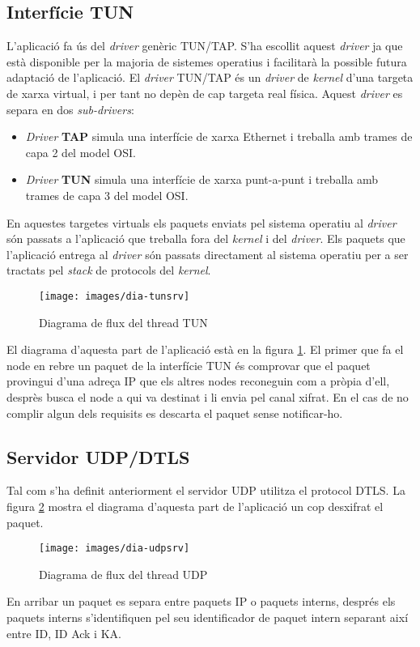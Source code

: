 \subsection{Interfície TUN}
L'aplicació fa ús del \emph{driver} genèric TUN/TAP. S'ha escollit aquest \emph{driver} ja que està disponible per la majoria de sistemes operatius i facilitarà la possible futura adaptació de l'aplicació.
El \emph{driver} TUN/TAP és un \emph{driver} de \emph{kernel} d'una targeta de xarxa virtual, i per tant no depèn de cap targeta real física.
Aquest \emph{driver} es separa en dos \emph{sub-drivers}:
\begin{itemize}
\item \emph{Driver} \textbf{TAP} simula una interfície de xarxa Ethernet i treballa amb trames de capa 2 del model OSI.
\item \emph{Driver} \textbf{TUN} simula una interfície de xarxa punt-a-punt i treballa amb trames de capa 3 del model OSI.
\end{itemize}
En aquestes targetes virtuals els paquets enviats pel sistema operatiu al \emph{driver} són passats a l'aplicació que treballa fora del \emph{kernel} i del \emph{driver}. Els paquets que l'aplicació entrega al \emph{driver} són passats directament al sistema operatiu per a ser tractats pel \emph{stack} de protocols del \emph{kernel}.

\begin{figure}[htb]
\centering
\texttt{[image: images/dia-tunsrv]}
\caption{Diagrama de flux del thread TUN}
\label{F:dia-tunsrv}
\end{figure}
El diagrama d'aquesta part de l'aplicació està en la figura \ref{F:dia-tunsrv}.
El primer que fa el node en rebre un paquet de la interfície TUN és comprovar que el paquet provingui d'una adreça IP que els altres nodes reconeguin com a pròpia d'ell, desprès busca el node a qui va destinat i li envia pel canal xifrat. En el cas de no complir algun dels requisits es descarta el paquet sense notificar-ho.

\subsection{Servidor UDP/DTLS}
Tal com s'ha definit anteriorment el servidor UDP utilitza el protocol DTLS. La figura \ref{F:dia-udpsrv} mostra el diagrama d'aquesta part de l'aplicació un cop desxifrat el paquet.
\begin{figure}[htb]
\centering
\texttt{[image: images/dia-udpsrv]}
\caption{Diagrama de flux del thread UDP}
\label{F:dia-udpsrv}
\end{figure}
En arribar un paquet es separa entre paquets IP o paquets interns, després els paquets interns s'identifiquen pel seu identificador de paquet intern separant així entre ID, ID Ack i KA.

